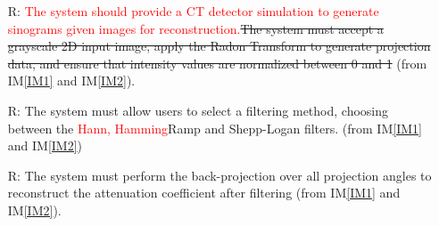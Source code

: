 \documentclass[12pt]{article}
\newcounter{reqnum} %
\newcommand{\add}{\textcolor{red}}
\begin{document}
\noindent \begin{itemize}

\item[R\refstepcounter{reqnum}\thereqnum \label{R1}:] \add{The system should
    provide a CT detector simulation to generate sinograms given images for reconstruction.}\st{The system must accept a
  grayscale 2D input image, apply the Radon Transform to generate projection
  data, and ensure that intensity values are normalized between 0 and 1} (from
  IM\ref{IM1} and IM\ref{IM2}).

\item[R\refstepcounter{reqnum}\thereqnum \label{R2}:] The system must allow users
  to select a filtering method, choosing between the \add{Hann, Hamming}Ramp and Shepp-Logan
  filters. (from IM\ref{IM1} and IM\ref{IM2})
\item[R\refstepcounter{reqnum}\thereqnum \label{R3}:] The system must perform the
  back-projection over all projection angles to reconstruct the attenuation
  coefficient after filtering (from IM\ref{IM1} and IM\ref{IM2}).

\end{itemize}
\end{document}
